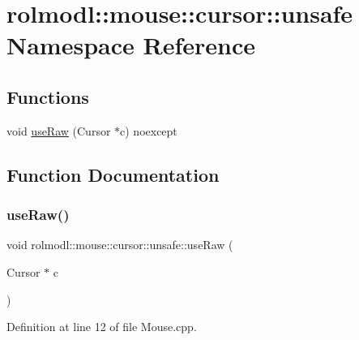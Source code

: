\hypertarget{namespacerolmodl_1_1mouse_1_1cursor_1_1unsafe}{}\section{rolmodl\+::mouse\+::cursor\+::unsafe Namespace Reference}
\label{namespacerolmodl_1_1mouse_1_1cursor_1_1unsafe}
\subsection*{Functions}
\begin{DoxyCompactItemize}
\item 
void \mbox{\hyperlink{namespacerolmodl_1_1mouse_1_1cursor_1_1unsafe_a0c2b7d5ac2d2088b91e7bd52e6263284}{use\+Raw}} (Cursor $\ast$c) noexcept
\end{DoxyCompactItemize}


\subsection{Function Documentation}
\mbox{\label{namespacerolmodl_1_1mouse_1_1cursor_1_1unsafe_a0c2b7d5ac2d2088b91e7bd52e6263284}} 
\subsubsection{\texorpdfstring{useRaw()}{useRaw()}}
{\footnotesize\ttfamily void rolmodl\+::mouse\+::cursor\+::unsafe\+::use\+Raw (\begin{DoxyParamCaption}\item[{Cursor $\ast$}]{c }\end{DoxyParamCaption})\hspace{0.3cm}{\ttfamily [noexcept]}}



Definition at line 12 of file Mouse.\+cpp.

